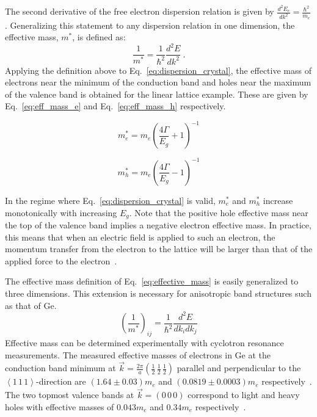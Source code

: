 The second derivative of the free electron dispersion relation is given by $\frac{d^2E_e}{dk^2} = \frac{\hbar^2}{m_e}$. Generalizing this statement to any dispersion relation in one dimension, the effective mass, $m^*$, is defined as:
\begin{equation}
	\frac{1}{m^*} = \frac{1}{\hbar^2}\frac{d^2E}{dk^2}~.
	\label{eq:effective_mass}
\end{equation}
Applying the definition above to Eq.~\ref{eq:dispersion_crystal}, the effective mass of electrons near the minimum of the conduction band and holes near the maximum of the valence band is obtained for the linear lattice example. These are given by Eq.~\ref{eq:eff_mass_e} and Eq.~\ref{eq:eff_mass_h} respectively.
\vspace{-0.5\baselineskip}
\begin{multicols}{2}
	\begin{equation}
		m_{e}^* = m_e\left(\frac{4\Gamma}{E_g} + 1\right)^{-1}
	\label{eq:eff_mass_e}
	\end{equation}

	\begin{equation}
		m_{h}^* = m_e\left(\frac{4\Gamma}{E_g} - 1\right)^{-1}
	\label{eq:eff_mass_h}
	\end{equation}
\end{multicols}
\noindent In the regime where Eq.~\ref{eq:dispersion_crystal} is valid, $m_e^*$ and $m_h^*$ increase monotonically with increasing $E_g$. Note that the positive hole effective mass near the top of the valence band implies a negative electron effective mass. In practice, this means that when an electric field is applied to such an electron, the momentum transfer from the electron to the lattice will be larger than that of the applied force to the electron~\cite{kittel}.

The effective mass definition of Eq.~\ref{eq:effective_mass} is easily generalized to three dimensions. This extension is necessary for anisotropic band structures such as that of Ge.
\begin{equation}
	\left(\frac{1}{m^*}\right)_{ij} = \frac{1}{\hbar^2}\frac{d^2E}{dk_i dk_j}
	\label{eq:effective_mass_3d}
\end{equation}
Effective mass can be determined experimentally with cyclotron resonance measurements. The measured effective masses of electrons in Ge at the conduction band minimum at $\vec{k} = \frac{2\pi}{a}\left(\frac{1}{2}\,\frac{1}{2}\,\frac{1}{2}\right)$ parallel and perpendicular to the $\left<1\,1\,1\right>$-direction are $(1.64 \pm 0.03)m_e$ and $(0.0819 \pm 0.0003)m_e$ respectively~\cite{eff_mass_e}. The two topmost valence bands at $\vec{k} = \left(0\,0\,0\right)$ correspond to light and heavy holes with effective masses of $0.043m_e$ and $0.34m_e$ respectively~\cite{kittel}.

